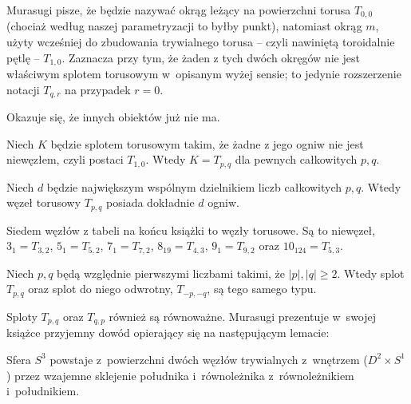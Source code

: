 Murasugi \cite[s. 135]{murasugi1996} pisze, że będzie nazywać okrąg leżący na powierzchni torusa $T_{0, 0}$ (chociaż według naszej parametryzacji to byłby punkt), natomiast okrąg $m$, użyty wcześniej do zbudowania trywialnego torusa -- czyli nawiniętą toroidalnie pętlę -- $T_{1, 0}$.
Zaznacza przy tym, że żaden z tych dwóch okręgów nie jest właściwym splotem torusowym w~opisanym wyżej sensie; to jedynie rozszerzenie notacji $T_{q, r}$ na przypadek $r = 0$.

Okazuje się, że innych obiektów już nie ma.

\begin{proposition}
    Niech $K$ będzie splotem torusowym takim, że żadne z jego ogniw nie jest niewęzłem, czyli postaci $T_{1, 0}$.
    Wtedy $K = T_{p, q}$ dla pewnych całkowitych $p, q$.
\end{proposition}

\begin{proposition}
    Niech $d$ będzie największym wspólnym dzielnikiem liczb całkowitych $p, q$.
    Wtedy węzeł torusowy $T_{p, q}$ posiada dokładnie $d$ ogniw.
\end{proposition}

Siedem węzłów z tabeli na końcu książki to węzły torusowe.
Są to niewęzeł, $3_1 = T_{3,2}$, $5_1 = T_{5,2}$, $7_1 = T_{7,2}$, $8_{19} = T_{4,3}$, $9_1 = T_{9,2}$ oraz $10_{124} = T_{5, 3}$.

\begin{proposition}
    Niech $p, q$ będą względnie pierwszymi liczbami takimi, że $|p|, |q| \ge 2$.
    Wtedy splot $T_{p, q}$ oraz splot do niego odwrotny, $T_{-p, -q}$, są tego samego typu.
\end{proposition}

Sploty $T_{p, q}$ oraz $T_{q, p}$ również są równoważne.
Murasugi prezentuje w~swojej książce \cite{murasugi1996} przyjemny dowód opierający się na następującym lemacie:

\begin{lemma}
    Sfera $S^3$ powstaje z~powierzchni dwóch węzłów trywialnych z~wnętrzem ($D^2 \times S^1$) przez wzajemne sklejenie południka i~równoleżnika z~równoleżnikiem i~południkiem.
\end{lemma}

